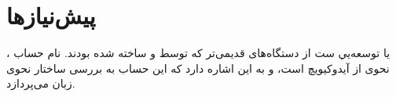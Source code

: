 \chapter{پیش‌نیازها} %
\label{chap:intro}

،
یا 
\cite{Lambek:lambek1958}
توسعه‌یي ست از دستگاه‌های قدیمی‌تر که توسط 
\cite{Adjukiewicz}
 و 
\cite{Bar-Hillel}
 ساخته شده بودند.
نام حساب نحوی از آیدوکیویچ است، و به این اشاره دارد که این حساب به بررسی ساختار نحوی زبان می‌پردازد.





